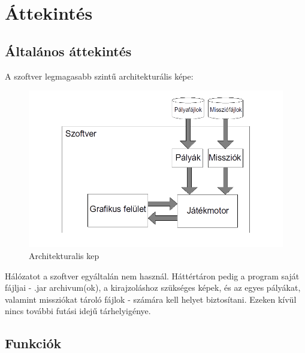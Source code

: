 \section{Áttekintés}
\subsection{Általános áttekintés}

\begin{samepage}
A szoftver legmagasabb szintű architekturális képe:
\newline
\begin{figure}
\centering
\includegraphics[width=170mm]{images/architekturalis_kep.png}
\caption{Architekturalis kep}
\label{overflow}
\end{figure}
\end{samepage}
\newline
Hálózatot a szoftver egyáltalán nem használ. Háttértáron pedig a program saját fájljai - .jar archivum(ok), a kirajzoláshoz szükséges képek, és az egyes pályákat, valamint missziókat tároló fájlok - számára kell helyet biztosítani. Ezeken kívül nincs további futási idejű tárhelyigénye.

\subsection{Funkciók}



